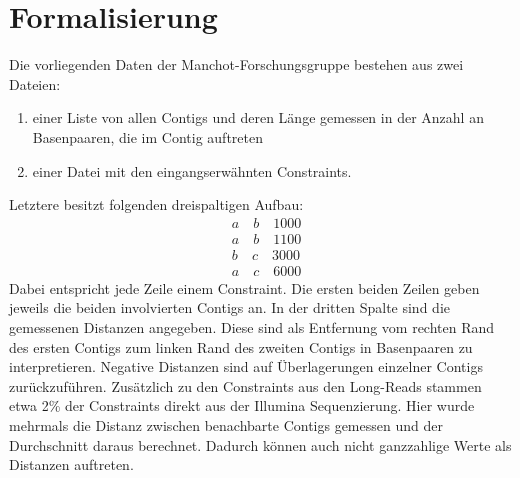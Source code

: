 \newcommand{\sprache}{deutsch}

\newcommand{\arbeit}{Bachelorarbeit}




\setcounter{page}{1}




\section{Formalisierung}\raggedbottom 

Die vorliegenden Daten der Manchot-Forschungsgruppe bestehen aus zwei Dateien: 
\begin{enumerate}
\item einer Liste von allen Contigs und deren Länge gemessen in der Anzahl an Basenpaaren, die im Contig auftreten
\item einer Datei mit den eingangserwähnten Constraints.
\end{enumerate}
Letztere besitzt folgenden dreispaltigen Aufbau:
\begin{align*}
&a \quad b \quad 1000\\
&a \quad b \quad 1100\\
&b \quad c \quad 3000\\
&a \quad c \quad 6000
\end{align*}
Dabei entspricht jede Zeile einem Constraint. Die ersten beiden Zeilen geben jeweils die beiden involvierten Contigs an. In der dritten Spalte sind die gemessenen Distanzen angegeben. Diese sind als Entfernung vom rechten Rand des ersten Contigs zum linken Rand des zweiten Contigs in Basenpaaren zu interpretieren. Negative Distanzen sind auf Überlagerungen einzelner Contigs zurückzuführen. Zusätzlich zu den Constraints aus den Long-Reads stammen etwa 2\% der Constraints direkt aus der Illumina Sequenzierung. Hier wurde mehrmals die Distanz zwischen benachbarte Contigs gemessen und der Durchschnitt daraus berechnet. Dadurch können auch nicht ganzzahlige Werte als Distanzen auftreten.

